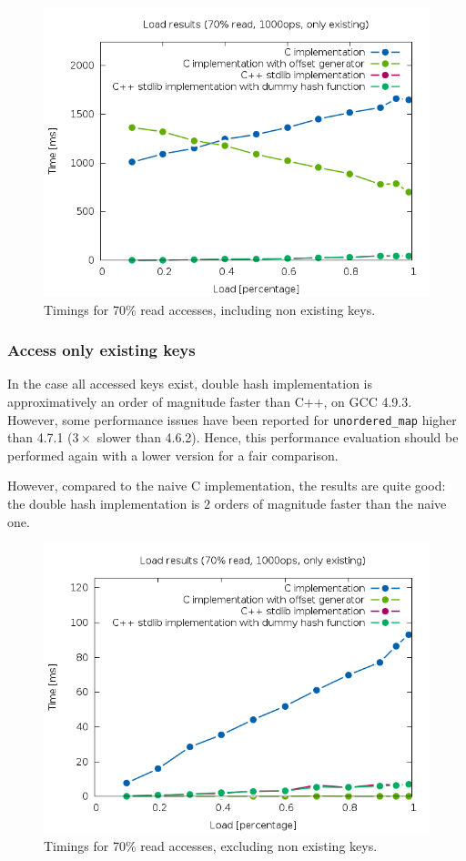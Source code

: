 \documentclass[oneside]{article}
\begin{document}
\begin{figure}[p]
	\centering
	\includegraphics[height=.4\textheight]{result_example_contains.png}
	\caption{Timings for 70\% read accesses, including non existing keys.}
	\label{fig:result_contains}
\end{figure}

\subsubsection{Access only existing keys}
In the case all accessed keys exist, double hash implementation is approximatively an order of magnitude faster than C++, on GCC 4.9.3. However, some performance issues have been reported for \texttt{unordered\_map} higher than 4.7.1 ($3\times$ slower than 4.6.2). Hence, this performance evaluation should be performed again with a lower version for a fair comparison. 

However, compared to the naive C implementation, the results are quite good: the double hash implementation is $2$ orders of magnitude faster than the naive one.

\begin{figure}[p]
	\centering
	\includegraphics[height=.4\textheight]{result_example_no_contains.png}
	\caption{Timings for 70\% read accesses, excluding non existing keys.}
	\label{fig:result_no_contains}
\end{figure}
\end{document}
